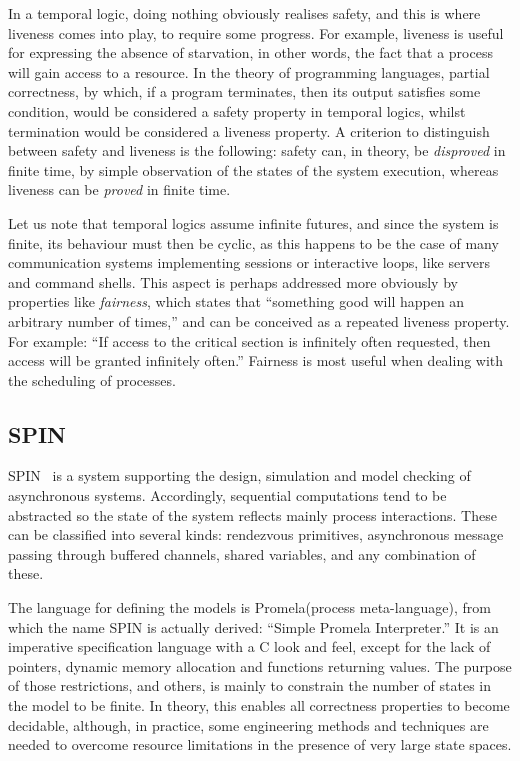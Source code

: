 \documentclass[a4paper,11pt,twoside]{article}
\newcommand\SPIN{\textsf{SPIN}\xspace}
\newcommand\Promela{\textsf{Promela}\xspace}
\newcommand\Clang{\textsf{C}\xspace}
\begin{document}
In a temporal logic, doing nothing obviously realises safety, and this
is where liveness comes into play, to require some progress. For
example, liveness is useful for expressing the absence of starvation,
in other words, the fact that a process will gain access to a
resource. In the theory of programming languages, partial correctness,
by which, if a program terminates, then its output satisfies some
condition, would be considered a safety property in temporal logics,
whilst termination would be considered a liveness property. A
criterion to distinguish between safety and liveness is the following:
safety can, in theory, be \emph{disproved} in finite time, by simple
observation of the states of the system execution, whereas liveness
can be \emph{proved} in finite time.

Let us note that temporal logics assume infinite futures, and since
the system is finite, its behaviour must then be cyclic, as this
happens to be the case of many communication systems implementing
sessions or interactive loops, like servers and command shells. This
aspect is perhaps addressed more obviously by properties like
\emph{fairness}, which states that ``something good will happen an
arbitrary number of times,'' and can be conceived as a repeated
liveness property. For example: ``If access to the critical section is
infinitely often requested, then access will be granted infinitely
often.'' Fairness is most useful when dealing with the scheduling of
processes.

\subsection{SPIN}

\SPIN~\citep{Holzmann:1997,Holzmann:2003,Benari:2008} is a system
supporting the design, simulation and model checking of asynchronous
systems. Accordingly, sequential computations tend to be abstracted so
the state of the system reflects mainly process interactions. These
can be classified into several kinds: rendezvous primitives,
asynchronous message passing through buffered channels, shared
variables, and any combination of these.

The language for defining the models is \Promela (process
meta\hyp{}language), from which the name \SPIN is actually derived:
``Simple \Promela Interpreter.'' It is an imperative specification
language with a \Clang look and feel, except for the lack of pointers,
dynamic memory allocation and functions returning values. The purpose
of those restrictions, and others, is mainly to constrain the number
of states in the model to be finite. In theory, this enables all
correctness properties to become decidable, although, in practice,
some engineering methods and techniques are needed to overcome
resource limitations in the presence of very large state spaces.
\end{document}
